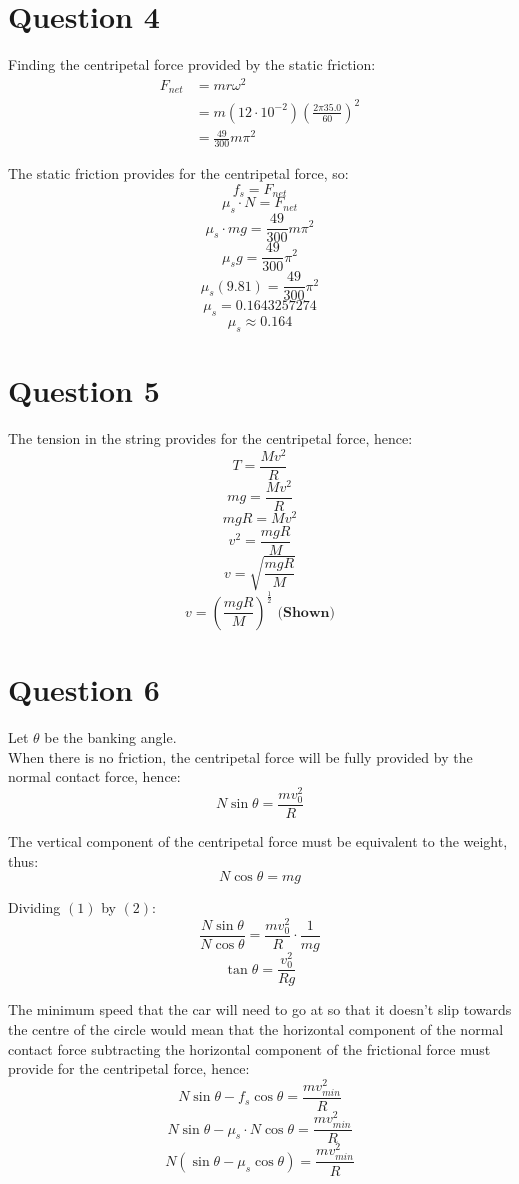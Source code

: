 \documentclass[11pt]{article}
\begin{document}
\newpage

\section{Question 4}
\label{sec:orgde73b1b}
Finding the centripetal force provided by the static friction:
\begin{align*}
F_{net} &= mr \omega^2 \\
&= m (12 \cdot 10^{-2}) \left(\frac{2\pi 35.0}{60} \right)^2 \\
&= \frac{49}{300} m \pi^2
\end{align*}

The static friction provides for the centripetal force, so:
\[f_s = F_{net}\]
\[\mu_s \cdot N = F_{net}\]
\[\mu_s \cdot mg = \frac{49}{300} m \pi^2\]
\[\mu_s g = \frac{49}{300} \pi^2\]
\[\mu_s (9.81) = \frac{49}{300} \pi^2\]
\[\mu_s = 0.1643257274\]
\[\mu_s \approx 0.164\]


\section{Question 5}
\label{sec:org4e71227}
The tension in the string provides for the centripetal force, hence:
\[T = \frac{Mv^2}{R}\]
\[mg = \frac{Mv^2}{R}\]
\[mgR = Mv^2\]
\[v^2 = \frac{mgR}{M}\]
\[v = \sqrt{\frac{mgR}{M}}\]
\[v = \left(\frac{mgR}{M} \right)^{\frac{1}{2}} \textbf{ (Shown)}\]


\section{Question 6}
\label{sec:org92c50ff}

Let \(\theta\) be the banking angle.
\\[0pt]

When there is no friction, the centripetal force will be fully provided by the normal contact force, hence:
\[N \sin \theta = \frac{mv_0^2}{R} \tag{1}\]

The vertical component of the centripetal force must be equivalent to the weight, thus:
\[N \cos \theta = mg \tag{2}\]

Dividing \((1)\) by \((2)\):
\[\frac{N \sin \theta}{N \cos \theta} = \frac{mv_0^2}{R} \cdot \frac{1}{mg}\]
\[\tan \theta = \frac{v_0^2}{Rg} \tag{3}\]

The minimum speed that the car will need to go at so that it doesn't slip towards the centre of the circle would mean that the horizontal component of the normal contact force subtracting the horizontal component of the frictional force must provide for the centripetal force, hence:
\[N \sin \theta - f_s \cos \theta = \frac{mv_{min}^2}{R}\]
\[N \sin \theta - \mu_s \cdot N \cos \theta = \frac{mv_{min}^2}{R}\]
\[N (\sin \theta - \mu_s \cos \theta) = \frac{mv_{min}^2}{R} \tag{4}\]
\end{document}
